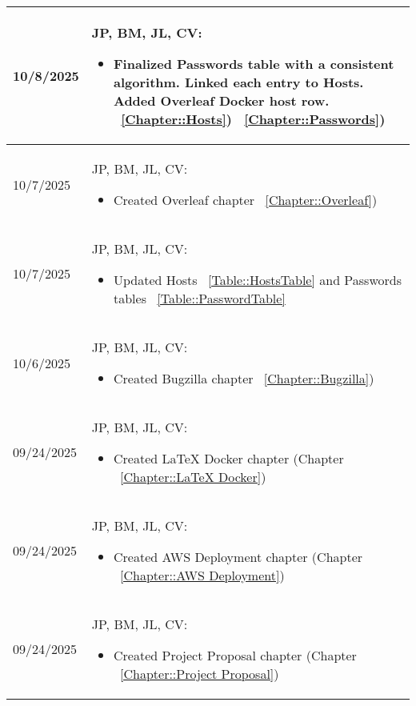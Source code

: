 \begin{longtable}{|l||p{13.5cm}|}
10/8/2025 & JP, BM, JL, CV:
\begin{itemize}[topsep=0pt,itemsep=0pt,parsep=0pt,partopsep=0pt,leftmargin=12pt]
\item Finalized Passwords table with a consistent algorithm. Linked each entry to Hosts. Added Overleaf Docker host row.
~\ref{Chapter::Hosts})
~\ref{Chapter::Passwords})
\end{itemize} 
\\ \hline

10/7/2025 & JP, BM, JL, CV:
\begin{itemize}[topsep=0pt,itemsep=0pt,parsep=0pt,partopsep=0pt,leftmargin=12pt]
\item Created Overleaf chapter
~\ref{Chapter::Overleaf})
\end{itemize} 
\\ \hline

10/7/2025 & JP, BM, JL, CV:
\begin{itemize}[topsep=0pt,itemsep=0pt,parsep=0pt,partopsep=0pt,leftmargin=12pt]
\item Updated Hosts ~\ref{Table::HostsTable} and Passwords tables
 ~\ref{Table::PasswordTable} 
\end{itemize} 
\\ \hline

10/6/2025 & JP, BM, JL, CV:
\begin{itemize}[topsep=0pt,itemsep=0pt,parsep=0pt,partopsep=0pt,leftmargin=12pt]
\item Created Bugzilla chapter
~\ref{Chapter::Bugzilla})
\end{itemize} 
\\ \hline

09/24/2025 & JP, BM, JL, CV:
\begin{itemize}[topsep=0pt,itemsep=0pt,parsep=0pt,partopsep=0pt,leftmargin=12pt]
\item Created LaTeX Docker chapter (Chapter 
~\ref{Chapter::LaTeX Docker})
\end{itemize} 
\\ \hline

09/24/2025 & JP, BM, JL, CV:
\begin{itemize}[topsep=0pt,itemsep=0pt,parsep=0pt,partopsep=0pt,leftmargin=12pt]
\item Created AWS Deployment chapter (Chapter 
~\ref{Chapter::AWS Deployment})
\end{itemize} 
\\ \hline

09/24/2025 & JP, BM, JL, CV:
\begin{itemize}[topsep=0pt,itemsep=0pt,parsep=0pt,partopsep=0pt,leftmargin=12pt]
\item Created Project Proposal chapter (Chapter 
~\ref{Chapter::Project Proposal})
\end{itemize} 
\\ \hline


\end{longtable}
